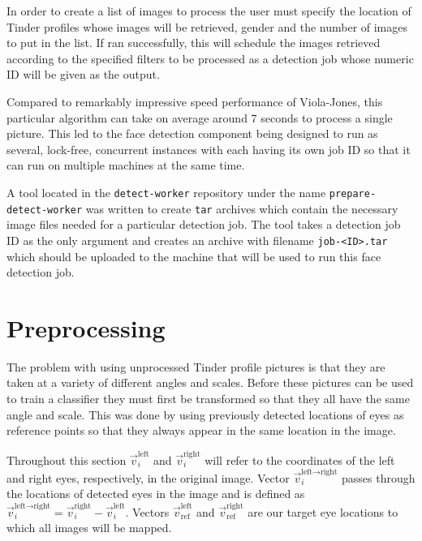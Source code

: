In order to create a list of images to process the user must specify the
location of Tinder profiles whose images will be retrieved, gender and the
number of images to put in the list. If ran successfully, this will schedule
the images retrieved according to the specified filters to be processed as a
detection job whose numeric ID will be given as the output.

Compared to remarkably impressive speed performance of Viola-Jones, this
particular algorithm can take on average around 7 seconds to process a single
picture. This led to the face detection component being designed to run as
several, lock-free, concurrent instances with each having its own job ID so
that it can run on multiple machines at the same time.

A tool located in the \texttt{detect-worker} repository under the name
\texttt{prepare-detect-worker} was written to create \texttt{tar} archives
which contain the necessary image files needed for a particular detection job.
The tool takes a detection job ID as the only argument and creates an archive
with filename \texttt{job-<ID>.tar} which should be uploaded to the machine
that will be used to run this face detection job.




\section{Preprocessing}
\label{spec:preproc}
\newcommand{\vleftright}{\vec{v}_i^{\text{left} \rightarrow \text{right}}}
\newcommand{\vi}[1]{\vec{v}_i^{\text{#1}}}
\newcommand{\vr}[1]{\vec{v}_{\text{ref}}^{\text{#1}}}
\newcommand{\vref}{\vec{v}_{\text{ref}}^{\text{left} \rightarrow \text{right}}}
The problem with using unprocessed Tinder profile pictures is that they are 
taken at a variety of different angles and scales. Before these pictures can 
be used to train a classifier they must first be transformed so that they all 
have the same angle and scale. This was done by using previously detected 
locations of eyes as reference points so that they always appear in the same 
location in the image. 

Throughout this section $\vi{left}$ and $\vi{right}$ will refer to the
coordinates of the left and right eyes, respectively, in the original image.
Vector $\vleftright$ passes through the locations of detected eyes in the image
and is defined as $\vleftright = \vi{right} - \vi{left}$. Vectors
$\vr{left}$ and $\vr{right}$ are our target eye locations to which all images
will be mapped.

